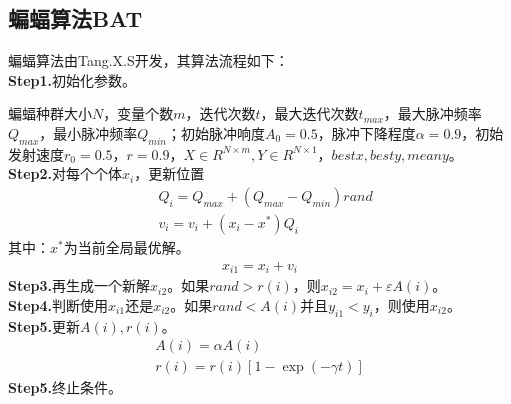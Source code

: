     \subsection{蝙蝠算法BAT}
        \par
        蝙蝠算法由Tang.X.S开发，其算法流程如下：\\
        \textbf{Step1.}初始化参数。
        \par
        蝙蝠种群大小$N$，变量个数$m$，迭代次数$t$，最大迭代次数$t_{max}$，最大脉冲频率$Q_{max}$，最小脉冲频率$Q_{min}$；初始脉冲响度$A_0=0.5$，脉冲下降程度$\alpha=0.9$，初始发射速度$r_0 = 0.5$，$r = 0.9$，$X\in R^{N\times m},Y\in R^{N\times 1}$，$bestx,besty,meany$。\\
        \textbf{Step2.}对每个个体$x_i$，更新位置
        \begin{align*}
        & Q_i = Q_{max} + (Q_{max} - Q_{min})rand\\
        & v_i = v_i+(x_i-x^*)Q_i
        \end{align*}
        其中：$x^*$为当前全局最优解。
        \begin{align*}
        x_{i1} = x_i + v_i
        \end{align*}
        \textbf{Step3.}再生成一个新解$x_{i2}$。如果$rand > r(i)$，则$x_{i2} = x_i + \varepsilon A(i)$。\\
        \textbf{Step4.}判断使用$x_{i1}$还是$x_{i2}$。如果$rand <A(i)$并且$y_{i1}<y_i$，则使用$x_{i2}$。\\
        \textbf{Step5.}更新$A(i),r(i)$。
        \begin{align*}
        A(i) = \alpha A(i)\\
        r(i) = r(i) [1-\exp(-\gamma t)]
        \end{align*}
        \textbf{Step5.}终止条件。

